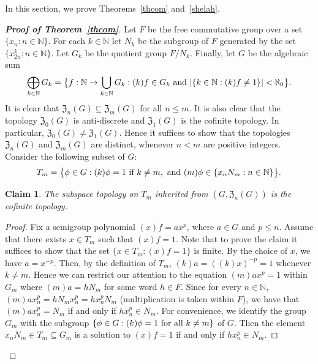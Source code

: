 \documentclass[11pt]{amsart}
\newtheorem{theorem}{Theorem}[section]
\newtheorem{claim}[theorem]{Claim}
\theoremstyle{definition}
\newcommand{\N}{\mathbb N}
\begin{document}
In this section, we prove Theorems~\ref{thcom} and~\ref{shelah}.


\begin{proof}[{\bf Proof of Theorem~\ref{thcom}}]
Let $F$ be the free commutative group over a set $\{x_n:n\in \mathbb N\}$. 
For each $k\in \N$ let $N_k$ be the subgroup of $F$ generated by the set $\{x^k_{2n}: n\in\mathbb N\}$. Let $G_k$ be the quotient group $F/N_k$. Finally, let $G$ be the algebraic sum 
$$\bigoplus_{k\in \N} G_k=\big\{f:\N\to \bigcup_{k\in \N}G_k: (k)f\in G_k\hbox { and }  |\{k\in \mathbb N:(k)f\neq 1\}|<\aleph_0\big\}.$$
It is clear that $\mathfrak{Z}_{n}(G)\subseteq \mathfrak{Z}_{m}(G)$ for all $n\leq m$. It is also clear that the topology $\mathfrak{Z}_0(G)$ is anti-discrete and $\mathfrak{Z}_1(G)$ is the cofinite topology. In particular, $\mathfrak{Z}_0(G)\neq \mathfrak{Z}_1(G)$.  
Hence it suffices to show that the topologies $\mathfrak{Z}_{n}(G)$ and 
$\mathfrak{Z}_{m}(G)$ are distinct, whenever $n<m$ are positive integers. Consider the following subset of $G$:
$$T_m=\big\{\phi\in G: (k)\phi=1 \hbox{ if }k\neq m, \hbox{ and }(m)\phi\in \{x_nN_m: n\in \mathbb N\}\big\}.$$

\begin{claim}
The subspace topology on $T_m$ inherited from $(G, \mathfrak{Z}_{n}(G))$ is the cofinite topology.
\end{claim}
\begin{proof}
Fix a semigroup polynomial $(x)f=ax^p$, where $a\in G$ and $p\leq n$. Assume that there exists $x\in T_m$ such that $(x)f=1$. Note that to prove the claim it suffices to show that the set $\{x\in T_m: (x)f=1\}$ is finite. By the choice of $x$, we have \(a=x^{-p}\). Then, by the definition of $T_m$, $(k)a=((k)x)^{-p}=1$ whenever $k\neq m$.
Hence we can restrict our attention to the equation $(m)ax^p=1$ within $G_m$ where $(m)a=hN_m$ for some word $h\in F$. 
Since for every $n\in\N$, $(m)ax_n^p=hN_mx_n^p=hx_n^pN_m$ (multiplication is taken within $F$), we have that $(m)ax_n^p=N_m$ if and only if $hx_n^p\in N_m$. 
For convenience, we identify the group \(G_m\) with the subgroup $\{\phi\in G: (k)\phi=1 \hbox{ for all }k\neq m\}$ of \(G\). Then the element $x_nN_m\in T_m\subseteq G_m$ is a solution to \((x)f=1\) if and only if $hx_n^p\in N_m$.


\end{proof}
\end{proof}
\end{document}
